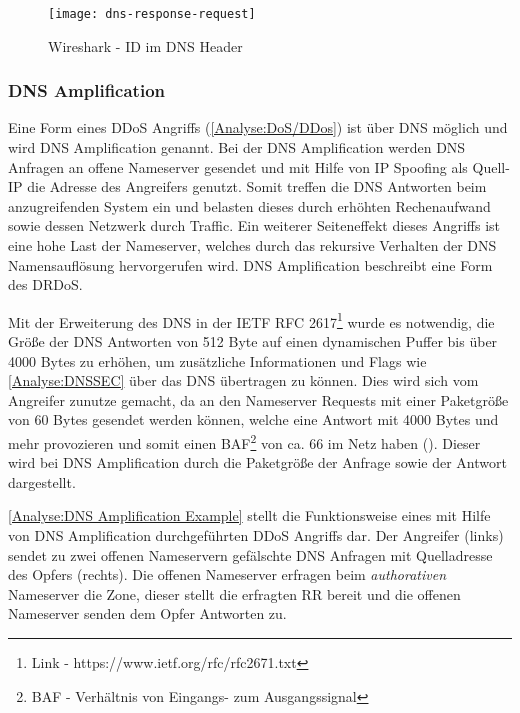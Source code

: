 \begin{figure}[h]
    \centering
    \texttt{[image: dns-response-request]}
    \caption{Wireshark - ID im DNS Header}
    \label{Analyse:DNS Request Response}
  \end{figure}
  
\clearpage

\subsubsection{\ac{DNS} Amplification}
\label{Analyse:DNS Amplification}
Eine Form eines \ac{DDoS} Angriffs (\autoref{Analyse:DoS/DDos}) ist über \ac{DNS} möglich und wird \ac{DNS} Amplification genannt. Bei der \ac{DNS} Amplification werden \ac{DNS} Anfragen an offene Nameserver gesendet und mit Hilfe von \ac{IP} Spoofing als Quell-\ac{IP} die Adresse des Angreifers genutzt. Somit treffen die \ac{DNS} Antworten beim anzugreifenden System ein und belasten dieses durch erhöhten Rechenaufwand sowie dessen Netzwerk durch Traffic. Ein weiterer Seiteneffekt dieses Angriffs ist eine hohe Last der Nameserver, welches durch das rekursive Verhalten der \ac{DNS} Namensauflösung hervorgerufen wird. \ac{DNS} Amplification beschreibt eine Form des \ac{DRDoS}.

Mit der Erweiterung des \ac{DNS} in der \ac{IETF} \ac{RFC} 2617\footnote{Link - https://www.ietf.org/rfc/rfc2671.txt} wurde es notwendig, die Größe der \ac{DNS} Antworten von 512 Byte auf einen dynamischen Puffer bis über 4000 Bytes zu erhöhen, um zusätzliche Informationen und Flags wie \autoref{Analyse:DNSSEC} über das \ac{DNS} übertragen zu können. Dies wird sich vom Angreifer zunutze gemacht, da an den Nameserver Requests mit einer Paketgröße von 60 Bytes gesendet werden können, welche eine Antwort mit 4000 Bytes und mehr provozieren und somit einen \ac{BAF}\footnote{BAF - Verhältnis von Eingangs- zum Ausgangssignal} von ca. 66 im Netz haben (\cite{Ledermueller2009}). Dieser wird bei \ac{DNS} Amplification durch die Paketgröße der Anfrage sowie der Antwort dargestellt.

\autoref{Analyse:DNS Amplification Example} stellt die Funktionsweise eines mit Hilfe von \ac{DNS} Amplification durchgeführten \ac{DDoS} Angriffs dar. Der Angreifer (links) sendet zu zwei offenen Nameservern gefälschte \ac{DNS} Anfragen mit Quelladresse des Opfers (rechts). Die offenen Nameserver erfragen beim \textit{authorativen} Nameserver die Zone, dieser stellt die erfragten \ac{RR} bereit und die offenen Nameserver senden dem Opfer Antworten zu.

